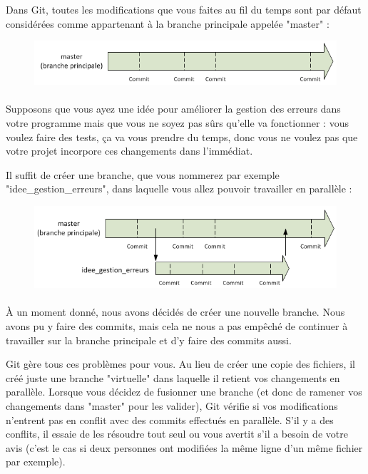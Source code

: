\documentclass[french, a4paper, 12pt, titlepage]{article}
\begin{document}
Dans Git, toutes les modifications que vous faites au fil du temps sont par défaut considérées comme appartenant à la branche principale appelée "master" :

\begin{figure}[h]
\includegraphics[width=\textwidth]{Branch1}
\end{figure}

\paragraph{}Supposons que vous ayez une idée pour améliorer la gestion des erreurs dans votre programme mais que vous ne soyez pas sûrs qu’elle va fonctionner : vous voulez faire des tests, ça va vous prendre du temps, donc vous ne voulez pas que votre projet incorpore ces changements dans l’immédiat.

Il suffit de créer une branche, que vous nommerez par exemple "idee\_gestion\_erreurs", dans laquelle vous allez pouvoir travailler en parallèle :

\begin{figure}[h]
\includegraphics[width=\textwidth]{Branch2}
\end{figure}

\paragraph{}À un moment donné, nous avons décidés de créer une nouvelle branche. Nous avons pu y faire des commits, mais cela ne nous a pas empêché de continuer à travailler sur la branche principale et d’y faire des commits aussi.

Git gère tous ces problèmes pour vous. Au lieu de créer une copie des fichiers, il créé juste une branche "virtuelle" dans laquelle il retient vos changements en parallèle. Lorsque vous décidez de fusionner une branche (et donc de ramener vos changements dans "master" pour les valider), Git vérifie si vos modifications n’entrent pas en conflit avec des commits effectués en parallèle. S’il y a des conflits, il essaie de les résoudre tout seul ou vous avertit s’il a besoin de votre avis (c’est le cas si deux personnes ont modifiées la même ligne d’un même fichier par exemple).
\end{document}
